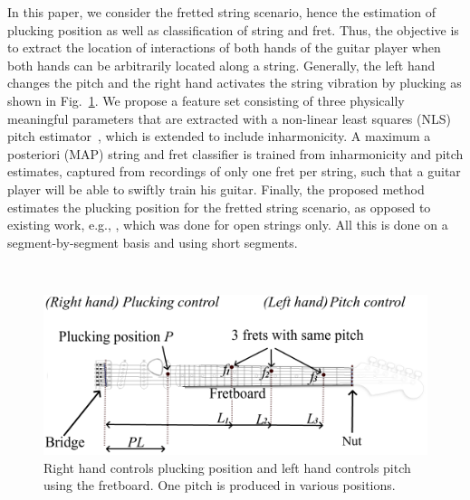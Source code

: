 \documentclass{article}
\begin{document}
%
\indent In this paper, we consider the fretted string scenario, hence the estimation of plucking position as well as classification of string and fret. Thus, the objective is to extract the location of interactions of both hands of the guitar player when both hands can be arbitrarily located along a string. Generally, the left hand changes the pitch and the right hand activates the string vibration by plucking as shown in Fig.~\ref{fig:guitar_overview}. We propose a feature set consisting of three physically meaningful parameters that are extracted with a non-linear least squares (NLS) pitch estimator~\cite{nielsen2017fast,multipitch,hansen2018parametric,DBLP:journals/sigpro/ChristensenSJJ08}, which is extended to include inharmonicity. A maximum a posteriori (MAP) string and fret classifier is trained from inharmonicity and pitch estimates, captured from recordings of only one fret per string, such that a guitar player will be able to swiftly train his guitar.  Finally, the proposed method estimates the plucking position for the fretted string scenario, as opposed to existing work, e.g.,  \cite{traube:pluckin_point_dafx,DBLP:conf/icassp/MohamadDH17}, which was done for open strings only. All this is done on a segment-by-segment basis and using short segments.
\begin{figure}[h!]\
  \centering
  \centerline{\includegraphics[width=.9\columnwidth]{img/fender_drawing7.png}}\vspace{-2mm}
  \caption{Right hand controls plucking position and left hand controls pitch using the fretboard. One pitch is produced in various positions.
  }\label{fig:guitar_overview}\vspace{-2mm}
\end{figure}


%
%
%
%
\vspace{-1.9mm}
\end{document}
